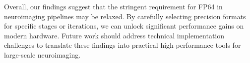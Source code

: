 \documentclass[journal,twoside,web]{ieeecolor}
\begin{document}
Overall, our findings suggest that the stringent requirement for FP64 in neuroimaging pipelines may be relaxed. By carefully selecting precision formats for specific stages or iterations, we can unlock significant performance gains on modern hardware. Future work should address technical implementation challenges to translate these findings into practical high-performance tools for large-scale neuroimaging.



\end{document}
